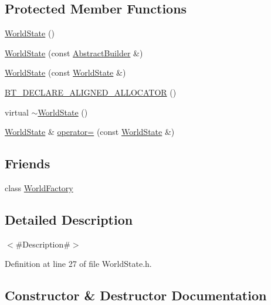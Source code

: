 \subsection*{Protected Member Functions}
\begin{DoxyCompactItemize}
\item 
\mbox{\hyperlink{classnjli_1_1_world_state_aa79b71b3516c96515eef6af9b8606286}{World\+State}} ()
\item 
\mbox{\hyperlink{classnjli_1_1_world_state_afc6c9395d05e594f76653bbeb2f7071b}{World\+State}} (const \mbox{\hyperlink{classnjli_1_1_abstract_builder}{Abstract\+Builder}} \&)
\item 
\mbox{\hyperlink{classnjli_1_1_world_state_a25d2acb92950ac2f0e2aa0a1db1ead88}{World\+State}} (const \mbox{\hyperlink{classnjli_1_1_world_state}{World\+State}} \&)
\item 
\mbox{\hyperlink{classnjli_1_1_world_state_ab1d6ddaa5a0e87c155772346996e167a}{B\+T\+\_\+\+D\+E\+C\+L\+A\+R\+E\+\_\+\+A\+L\+I\+G\+N\+E\+D\+\_\+\+A\+L\+L\+O\+C\+A\+T\+OR}} ()
\item 
virtual \mbox{\hyperlink{classnjli_1_1_world_state_a71ed8f1180c5c6c0fe0f7f827f150d05}{$\sim$\+World\+State}} ()
\item 
\mbox{\hyperlink{classnjli_1_1_world_state}{World\+State}} \& \mbox{\hyperlink{classnjli_1_1_world_state_a512bad5b9134e2e54361f6fadd3781ed}{operator=}} (const \mbox{\hyperlink{classnjli_1_1_world_state}{World\+State}} \&)
\end{DoxyCompactItemize}
\subsection*{Friends}
\begin{DoxyCompactItemize}
\item 
class \mbox{\hyperlink{classnjli_1_1_world_state_acb96ebb09abe8f2a37a915a842babfac}{World\+Factory}}
\end{DoxyCompactItemize}


\subsection{Detailed Description}
$<$\#\+Description\#$>$ 

Definition at line 27 of file World\+State.\+h.



\subsection{Constructor \& Destructor Documentation}
\mbox{\label{classnjli_1_1_world_state_aa79b71b3516c96515eef6af9b8606286}} 
